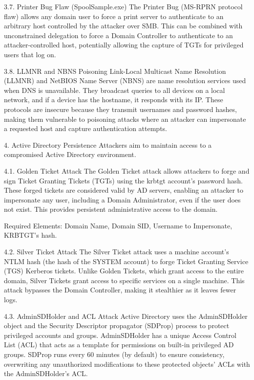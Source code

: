 3.7. Printer Bug Flaw (SpoolSample.exe)
The Printer Bug (MS-RPRN protocol flaw) allows any domain user to force a print server to authenticate to an arbitrary host controlled by the attacker over SMB. This can be combined with unconstrained delegation to force a Domain Controller to authenticate to an attacker-controlled host, potentially allowing the capture of TGTs for privileged users that log on.

3.8. LLMNR and NBNS Poisoning
Link-Local Multicast Name Resolution (LLMNR) and NetBIOS Name Server (NBNS) are name resolution services used when DNS is unavailable. They broadcast queries to all devices on a local network, and if a device has the hostname, it responds with its IP. These protocols are insecure because they transmit usernames and password hashes, making them vulnerable to poisoning attacks where an attacker can impersonate a requested host and capture authentication attempts.

4. Active Directory Persistence
Attackers aim to maintain access to a compromised Active Directory environment.

4.1. Golden Ticket Attack
The Golden Ticket attack allows attackers to forge and sign Ticket Granting Tickets (TGTs) using the krbtgt account's password hash. These forged tickets are considered valid by AD servers, enabling an attacker to impersonate any user, including a Domain Administrator, even if the user does not exist. This provides persistent administrative access to the domain.

Required Elements: Domain Name, Domain SID, Username to Impersonate, KRBTGT's hash.

4.2. Silver Ticket Attack
The Silver Ticket attack uses a machine account's NTLM hash (the hash of the SYSTEM account) to forge Ticket Granting Service (TGS) Kerberos tickets. Unlike Golden Tickets, which grant access to the entire domain, Silver Tickets grant access to specific services on a single machine. This attack bypasses the Domain Controller, making it stealthier as it leaves fewer logs.

4.3. AdminSDHolder and ACL Attack
Active Directory uses the AdminSDHolder object and the Security Descriptor propagator (SDProp) process to protect privileged accounts and groups. AdminSDHolder has a unique Access Control List (ACL) that acts as a template for permissions on built-in privileged AD groups. SDProp runs every 60 minutes (by default) to ensure consistency, overwriting any unauthorized modifications to these protected objects' ACLs with the AdminSDHolder's ACL.

